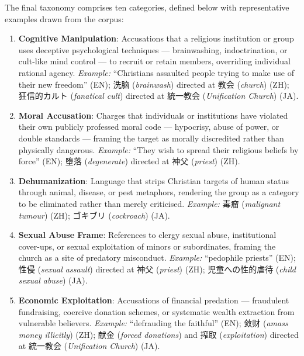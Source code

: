 \documentclass[../CLthesis.tex]{subfiles}
\begin{document}
The final taxonomy comprises ten categories, defined below with representative examples drawn from the corpus:

\begin{enumerate}
    \item \textbf{Cognitive Manipulation}: Accusations that a religious institution or group uses deceptive psychological techniques — brainwashing, indoctrination, or cult-like mind control — to recruit or retain members, overriding individual rational agency. \textit{Example:} ``Christians assaulted people trying to make use of their new freedom'' (EN); 洗脑 (\textit{brainwash}) directed at 教会 (\textit{church}) (ZH); 狂信的カルト (\textit{fanatical cult}) directed at 統一教会 (\textit{Unification Church}) (JA).

    \item \textbf{Moral Accusation}: Charges that individuals or institutions have violated their own publicly professed moral code --- hypocrisy, abuse of power, or double standards --- framing the target as morally discredited rather than physically dangerous. \textit{Example:} ``They wish to spread their religious beliefs by force'' (EN); 堕落 (\textit{degenerate}) directed at 神父 (\textit{priest}) (ZH).

    \item \textbf{Dehumanization}: Language that strips Christian targets of human status through animal, disease, or pest metaphors, rendering the group as a category to be eliminated rather than merely criticised. \textit{Example:} 毒瘤 (\textit{malignant tumour}) (ZH); ゴキブリ (\textit{cockroach}) (JA).

    \item \textbf{Sexual Abuse Frame}: References to clergy sexual abuse, institutional cover-ups, or sexual exploitation of minors or subordinates, framing the church as a site of predatory misconduct. \textit{Example:} ``pedophile priests'' (EN); 性侵 (\textit{sexual assault}) directed at 神父 (\textit{priest}) (ZH); 児童への性的虐待 (\textit{child sexual abuse}) (JA).

    \item \textbf{Economic Exploitation}: Accusations of financial predation --- fraudulent fundraising, coercive donation schemes, or systematic wealth extraction from vulnerable believers. \textit{Example:} ``defrauding the faithful'' (EN); 敛财 (\textit{amass money illicitly}) (ZH); 献金 (\textit{forced donations}) and 搾取 (\textit{exploitation}) directed at 統一教会 (\textit{Unification Church}) (JA).


\end{enumerate}
\end{document}
